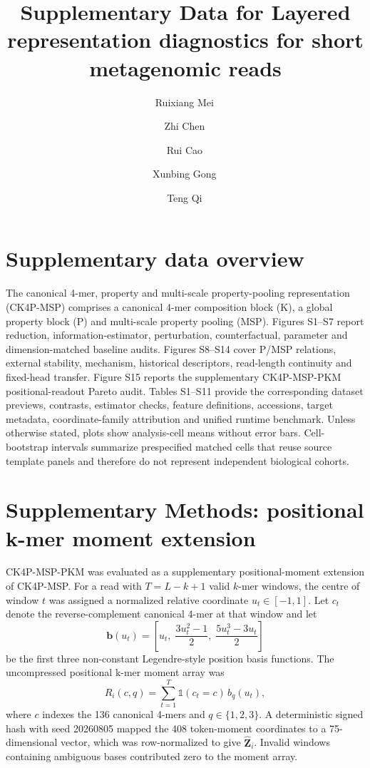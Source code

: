 \documentclass[unnumsec,webpdf,modern,large,numbered]{oup-authoring-template}
\title[Supplementary Data]{Supplementary Data for Layered representation diagnostics for short metagenomic reads}
\author[1,*]{Ruixiang Mei\,\ORCID{0009-0003-2128-0726}}
\author[2]{Zhi Chen\,\ORCID{0009-0001-0072-5576}}
\author[3]{Rui Cao\,\ORCID{0009-0006-6182-1381}}
\author[2]{Xunbing Gong\,\ORCID{0009-0009-6715-0656}}
\author[2]{Teng Qi\,\ORCID{0009-0007-7648-4776}}
\begin{document}
\renewcommand{\thefigure}{S\arabic{figure}}
\renewcommand{\thetable}{S\arabic{table}}
\maketitle
\section{Supplementary data overview}
The canonical 4-mer, property and multi-scale property-pooling representation (CK4P-MSP) comprises a canonical 4-mer composition block (K), a global property block (P) and multi-scale property pooling (MSP). Figures S1--S7 report reduction, information-estimator, perturbation, counterfactual, parameter and dimension-matched baseline audits. Figures S8--S14 cover P/MSP relations, external stability, mechanism, historical descriptors, read-length continuity and fixed-head transfer. Figure S15 reports the supplementary CK4P-MSP-PKM positional-readout Pareto audit. Tables S1--S11 provide the corresponding dataset previews, contrasts, estimator checks, feature definitions, accessions, target metadata, coordinate-family attribution and unified runtime benchmark. Unless otherwise stated, plots show analysis-cell means without error bars. Cell-bootstrap intervals summarize prespecified matched cells that reuse source template panels and therefore do not represent independent biological cohorts.

\section{Supplementary Methods: positional k-mer moment extension}

CK4P-MSP-PKM was evaluated as a supplementary positional-moment extension of CK4P-MSP. For a read with $T=L-k+1$ valid $k$-mer windows, the centre of window $t$ was assigned a normalized relative coordinate $u_t\in[-1,1]$. Let $c_t$ denote the reverse-complement canonical 4-mer at that window and let
\[
\mathbf{b}(u_t)
=
\left[
u_t,\;
\frac{3u_t^2-1}{2},\;
\frac{5u_t^3-3u_t}{2}
\right]
\]
be the first three non-constant Legendre-style position basis functions. The uncompressed positional k-mer moment array was
\[
R_i(c,q)
=
\sum_{t=1}^{T}
\mathbb{1}(c_t=c)\,b_q(u_t),
\]
where $c$ indexes the 136 canonical 4-mers and $q\in\{1,2,3\}$. A deterministic signed hash with seed 20260805 mapped the 408 token-moment coordinates to a 75-dimensional vector, which was row-normalized to give $\hat{\mathbf{Z}}_i$. Invalid windows containing ambiguous bases contributed zero to the moment array.
\end{document}
